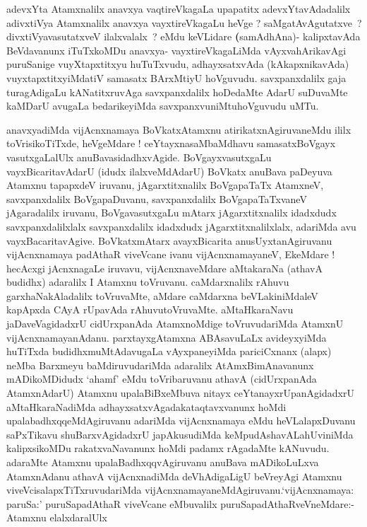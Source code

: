 \begin{artha}
adevxYta Atamxnalilx anavxya vaqtireVkagaLa upapatitx
adevxYtavAdadalilx adivxtiVya Atamxnalilx anavxya vayxtireVkagaLu heVge
? saMgatAvAgutatxve~? divxtiVyavasutatxveV ilalxvalalx~? eMdu keVLidare
\textbf(samAdhAna)- kalipxtavAda BeVdavanunx iTuTxkoMDu anavxya-
vayxtireVkagaLiMda vAyxvahArikavAgi puruSanige vuyXtapxtitxyu
huTuTxvudu, adhayxsatxvAda (kAkapxnikavAda) vuyxtapxtitxyiMdatiV
samasatx BArxMtiyU hoVguvudu. savxpanxdalilx gaja turagAdigaLu
kANatitxruvAga savxpanxdalilx hoDedaMte AdarU suDuvaMte kaMDarU
avugaLa bedarikeyiMda savxpanxvuniMtuhoVguvudu uMTu.
\end{artha}

\begin{artha}
anavxyadiMda vijAcnxnamaya BoVkatxAtamxnu atirikatxnAgiruvaneMdu ililx
toVrisikoTiTxde, heVgeMdare ! ceYtayxnasaMbaMdhavu samasatxBoVgayx
vasutxgaLalUlx anuBavasidadhxvAgide. BoVgayxvasutxgaLu
vayxBicaritavAdarU (idudx ilalxveMdAdarU) BoVkatx anuBava paDeyuva
Atamxnu tapapxdeV iruvanu, jAgarxtitxnalilx BoVgapaTaTx AtamxneV,
savxpanxdalilx BoVgapaDuvanu, savxpanxdalilx BoVgapaTaTxvaneV
jAgaradalilx iruvanu, BoVgavasutxgaLu mAtarx jAgarxtitxnalilx
idadxdudx savxpanxdalilxlalx savxpanxdalilx idadxdudx jAgarxtitxnalilxlalx,
adariMda avu vayxBacaritavAgive. BoVkatxmAtarx avayxBicarita
anusUyxtanAgiruvanu vijAcnxnamaya padAthaR viveVcane ivanu
vijAcnxnamayaneV, EkeMdare ! hecAcxgi jAcnxnagaLe iruvavu,
vijAcnxnaveMdare aMtakaraNa (athavA budidhx) adaralilx I Atamxnu
toVruvanu. caMdarxnalilx rAhuvu garxhaNakAladalilx toVruvaMte, aMdare
caMdarxna beVLakiniMdaleV kapApxda CAyA rUpavAda
rAhuvutoVruvaMte. aMtaHkaraNavu jaDaveVagidadxrU cidUrxpanAda
AtamxnoMdige toVruvudariMda AtamxnU
vijAcnxnamayanAdanu. parxtayxgAtamxna ABAsavuLaLx avideyxyiMda
huTiTxda budidhxmuMtAdavugaLa vAyxpaneyiMda pariciCxnanx (alapx) neMba
Barxmeyu baMdiruvudariMda adaralilx AtAmxBimAnavanunx mADikoMDidudx
`ahamf' eMdu toVribaruvanu athavA (cidUrxpanAda AtamxnAdarU) Atamxnu
upalaBiBxeMbuva nitayx ceYtanayxrUpanAgidadxrU aMtaHkaraNadiMda
adhayxsatxvAgadakataqtavxvanunx hoMdi upalabadhxqqeMdAgiruvanu
adariMda vijAcnxnamaya eMdu heVLalapxDuvanu saPxTikavu
shuBarxvAgidadxrU japAkusudiMda keMpudAshavALahUviniMda kalipxsikoMDu
rakatxvaNavanunx hoMdi padamx rAgadaMte kANuvudu. adaraMte Atamxnu
upalaBadhxqqvAgiruvanu anuBava mADikoLuLxva AtamxnAdanu athavA
vijAcnxnadiMda deVhAdigaLigU beVreyAgi Atamxnu
viveVcisalapxTiTxruvudariMda
vijAcnxnamayaneMdAgiruvanu.`vijAcnxnamaya: paruSa:' puruSapadAthaR
viveVcane eMbuvalilx puruSapadAthaRveVneMdare:- Atamxnu elalxdaralUlx

\end{artha}
